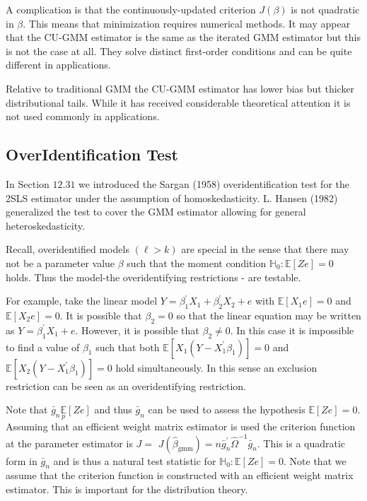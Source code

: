 \documentclass[10pt]{article}
\begin{document}
A complication is that the continuously-updated criterion $J(\beta)$ is not quadratic in $\beta$. This means that minimization requires numerical methods. It may appear that the CU-GMM estimator is the same as the iterated GMM estimator but this is not the case at all. They solve distinct first-order conditions and can be quite different in applications.

Relative to traditional GMM the CU-GMM estimator has lower bias but thicker distributional tails. While it has received considerable theoretical attention it is not used commonly in applications.

\subsection{OverIdentification Test}
In Section $12.31$ we introduced the Sargan (1958) overidentification test for the 2SLS estimator under the assumption of homoskedasticity. L. Hansen (1982) generalized the test to cover the GMM estimator allowing for general heteroskedasticity.

Recall, overidentified models $(\ell>k)$ are special in the sense that there may not be a parameter value $\beta$ such that the moment condition $\mathbb{H}_{0}: \mathbb{E}[Z e]=0$ holds. Thus the model-the overidentifying restrictions - are testable.

For example, take the linear model $Y=\beta_{1}^{\prime} X_{1}+\beta_{2}^{\prime} X_{2}+e$ with $\mathbb{E}\left[X_{1} e\right]=0$ and $\mathbb{E}\left[X_{2} e\right]=0$. It is possible that $\beta_{2}=0$ so that the linear equation may be written as $Y=\beta_{1}^{\prime} X_{1}+e$. However, it is possible that $\beta_{2} \neq 0$. In this case it is impossible to find a value of $\beta_{1}$ such that both $\mathbb{E}\left[X_{1}\left(Y-X_{1}^{\prime} \beta_{1}\right)\right]=0$ and $\mathbb{E}\left[X_{2}\left(Y-X_{1}^{\prime} \beta_{1}\right)\right]=0$ hold simultaneously. In this sense an exclusion restriction can be seen as an overidentifying restriction.

Note that $\bar{g}_{n} \underset{p}{\mathbb{E}}[Z e]$ and thus $\bar{g}_{n}$ can be used to assess the hypothesis $\mathbb{E}[Z e]=0$. Assuming that an efficient weight matrix estimator is used the criterion function at the parameter estimator is $J=$ $J\left(\widehat{\beta}_{\mathrm{gmm}}\right)=n \bar{g}_{n}^{\prime} \widehat{\Omega}^{-1} \bar{g}_{n}$. This is a quadratic form in $\bar{g}_{n}$ and is thus a natural test statistic for $\mathbb{H}_{0}: \mathbb{E}[Z e]=0$. Note that we assume that the criterion function is constructed with an efficient weight matrix estimator. This is important for the distribution theory.
\end{document}
